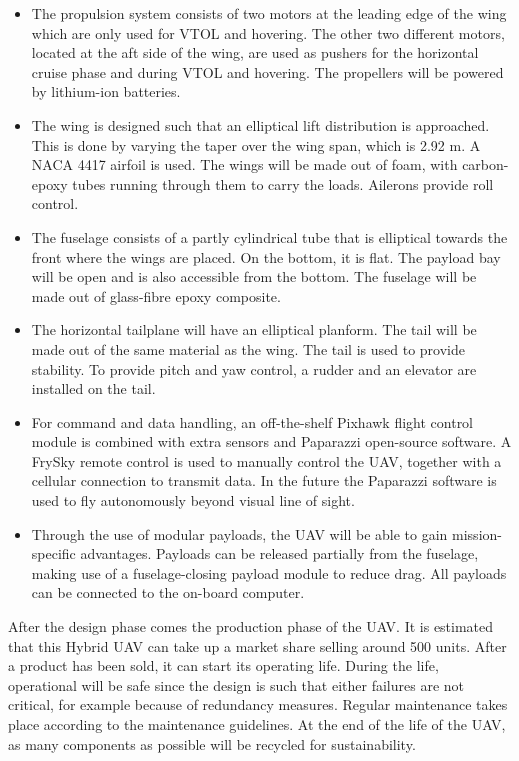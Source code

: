 \begin{itemize}
    \item The propulsion system consists of two motors at the leading edge of the wing which are only used for VTOL and hovering. The other two different motors, located at the aft side of the wing, are used as pushers for the horizontal cruise phase and during VTOL and hovering. The propellers will be powered by lithium-ion batteries.
    \item The wing is designed such that an elliptical lift distribution is approached. This is done by varying the taper over the wing span, which is 2.92 m. A NACA 4417 airfoil is used. The wings will be made out of foam, with carbon-epoxy tubes running through them to carry the loads. Ailerons provide roll control. %
    \item The fuselage consists of a partly cylindrical tube that is elliptical towards the front where the wings are placed. On the bottom, it is flat. The payload bay will be open and is also accessible from the bottom.%
    The fuselage will be made out of glass-fibre epoxy composite.  %
    \item The horizontal tailplane will have an elliptical planform. The tail will be made out of the same material as the wing. The tail is used to provide stability. To provide pitch and yaw control, a rudder and an elevator are installed on the tail.
    \item For command and data handling, an off-the-shelf Pixhawk flight control module is combined with extra sensors and Paparazzi open-source software. A FrySky remote control is used to manually control the UAV, together with a cellular connection to transmit data. In the future the Paparazzi software is used to fly autonomously beyond visual line of sight.
    \item Through the use of modular payloads, the UAV will be able to gain mission-specific advantages. Payloads can be released partially from the fuselage, making use of a fuselage-closing payload module to reduce drag. All payloads can be connected to the on-board computer.
\end{itemize}

After the design phase comes the production phase of the UAV.  %
It is estimated that this Hybrid UAV can take up a market share selling around 500 units. After a product has been sold, it can start its operating life. During the life, operational will be safe since the design is such that either failures are not critical, for example because of redundancy measures. Regular maintenance takes place according to the maintenance guidelines. At the end of the life of the UAV, as many components as possible will be recycled for sustainability.






 










